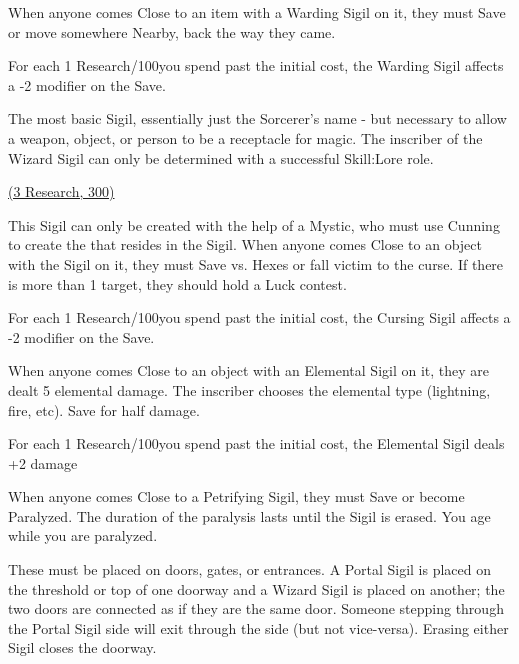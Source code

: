 {When anyone comes Close to an item with a Warding Sigil on it, they must Save or move somewhere Nearby, back the way they came.  

For each 1 Research/100\FE you spend past the initial cost, the Warding Sigil affects a -2 modifier on the Save.



The most basic Sigil, essentially just the Sorcerer's name - but necessary to allow a weapon, object, or person to be a receptacle for magic.  The inscriber of the Wizard Sigil can only be determined with a successful Skill:Lore role.


\large{\underline{ (3 Research, 300\AG)}}\normalsize


This Sigil can only be created with the help of a Mystic, who must use Cunning to create the  that resides in the Sigil.  When anyone comes Close to an object with the Sigil on it, they must Save vs. Hexes or fall victim to the curse. If there is more than 1 target, they should hold a Luck contest.

For each 1 Research/100\AG you spend past the initial cost, the Cursing Sigil affects a -2 modifier on the Save.



When anyone comes Close to an object with an Elemental Sigil on it, they are dealt 5 elemental damage.  The inscriber chooses the elemental type (lightning, fire, etc).  Save for half damage.

For each 1 Research/100\AG you spend past the initial cost, the Elemental Sigil deals +2 damage



When anyone comes Close to a Petrifying Sigil, they must Save or become Paralyzed.  The duration of the paralysis lasts until the Sigil is erased. You age while you are paralyzed.


These must be placed on doors, gates, or entrances.  A Portal Sigil is placed on the threshold or top of one doorway and a Wizard Sigil is placed on another; the two doors are connected as if they are the same door.  Someone stepping through the Portal Sigil side will exit through the  side (but not vice-versa).  Erasing either Sigil closes the doorway.

}
